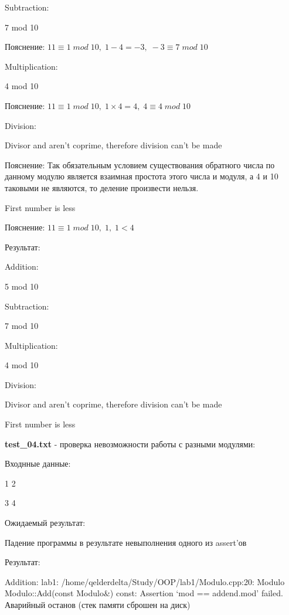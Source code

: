 \documentclass[a4paper, 12pt]{article}
\begin{document}
Subtraction:

7 mod 10

Пояснение: $11 \equiv 1\;mod\;10,\;1 - 4 = -3,\; -3 \equiv 7\;mod\;10 $

Multiplication:

4 mod 10

Пояснение: $11 \equiv 1\;mod\;10,\;1 \times 4 = 4,\; 4 \equiv 4\;mod\;10 $

Division:

Divisor and aren't coprime, therefore division can't be made

Пояснение: Так обязательным условием существования обратного числа по данному модулю является взаимная простота этого числа и модуля, а 4 и 10 таковыми не являются, то деление произвести нельзя.

First number is less

Пояснение: $11 \equiv 1\;mod\;10,\;1,\; 1 < 4$

\vspace{3ex}

Результат:

Addition:

5 mod 10

Subtraction:

7 mod 10

Multiplication:

4 mod 10

Division:

Divisor and aren't coprime, therefore division can't be made

First number is less


\vspace{3ex}

\textbf{test\_04.txt} - проверка невозможности работы с разными модулями:

Входнные данные:

1 2

3 4

\vspace{3ex}

Ожидаемый результат:

Падение программы в результате невыполнения одного из assert'ов

\vspace{3ex}

Результат:

Addition:
lab1: /home/qelderdelta/Study/OOP/lab1/Modulo.cpp:20: Modulo Modulo::Add(const Modulo\&) const: Assertion `mod == addend.mod' failed.
Аварийный останов (стек памяти сброшен на диск)
\end{document}
